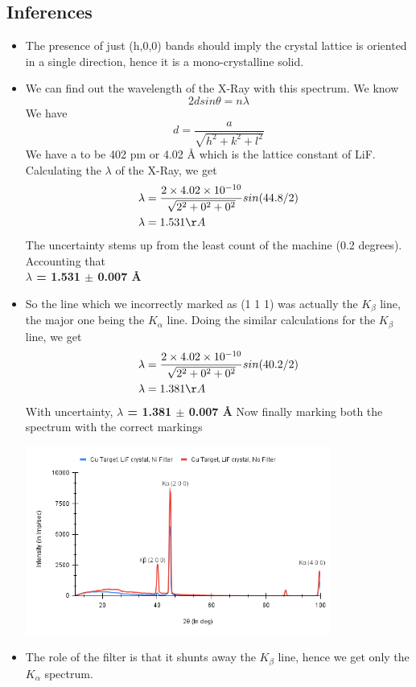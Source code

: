 \documentclass[]{report}[12 pt]
\begin{document}
\subsection*{Inferences}
\begin{itemize}
	\item The presence of just (h,0,0) bands should imply the crystal lattice is oriented in a single direction, hence it is a mono-crystalline solid.
	\item We can find out the wavelength of the X-Ray with this spectrum.
	We know\\
	\begin{equation*}
		2dsin\theta=n\lambda
	\end{equation*}
	We have 
	\[d=\frac{a}{\sqrt{h^2+k^2+l^2}}\]
	We have a to be 402 pm or 4.02 {\AA}  which is the lattice constant of LiF.
	Calculating the $\lambda$ of the X-Ray, we get
	\begin{align*}
		\lambda &= \frac{2\times4.02\times10^{-10}}{\sqrt{2^2+0^2+0^2}} sin(44.8/2)\\
		\lambda &= 1.531 {\AA}
	\end{align*}
	The uncertainty stems up from the least count of the machine (0.2 degrees). Accounting that\\
	\textbf{$\lambda$ = 1.531 $\pm$ 0.007 \AA}
	\item So the line which we incorrectly marked as (1 1 1) was actually the $K_{\beta}$ line, the major one being the $K_{\alpha}$ line. Doing the similar calculations for the $K_{\beta}$  line, we get
	\begin{align*}
		\lambda &= \frac{2\times4.02\times10^{-10}}{\sqrt{2^2+0^2+0^2}} sin(40.2/2)\\
		\lambda &= 1.381 {\AA}
	\end{align*}
	With uncertainty, \textbf{$\lambda$ = 1.381 $\pm$ 0.007 \AA}
	Now finally marking both the spectrum with the correct markings
	\begin{center}
		\includegraphics[width=10cm]{a2.png}
	\end{center}
	\item The role of the filter is that it shunts away the $K_{\beta}$ line, hence we get only the $K_{\alpha} $ spectrum.
\end{itemize}
\end{document}
